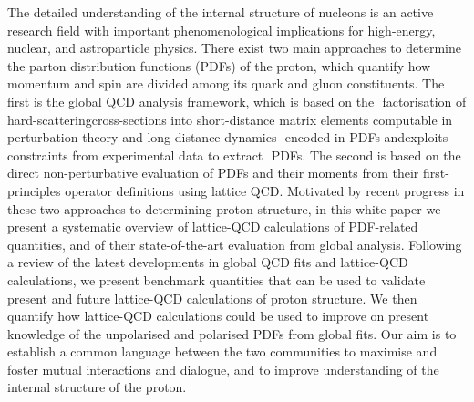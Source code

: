 \documentclass[twoside,12pt]{article}
\numberwithin{equation}{section}
\numberwithin{figure}{section}
\numberwithin{table}{section}
\begin{document}
The detailed understanding of the internal structure of nucleons is an active
research field with important phenomenological implications for
high-energy, nuclear, and astroparticle physics.
%
There exist two main approaches to determine the
parton distribution functions (PDFs) of the proton, which
quantify how momentum and spin 
are divided among its quark and gluon constituents.
%
The​ ​first​ ​is​ the ​global​ ​QCD​ ​analysis framework,​ ​which​ ​is​ ​based​ ​on the​ ​
factorisation​ ​of​ ​hard-scattering​ ​cross-sections​ ​into​ ​short-distance​ ​matrix​ 
​elements computable​ ​in​ ​perturbation​ ​theory​ ​and​ ​long-distance​ ​dynamics​ ​
encoded​ ​in​ ​PDFs and ​exploits constraints​ ​from​ ​experimental​ ​data​ ​to​ ​extract​ ​
PDFs.
%
The second is based on the direct non-perturbative evaluation of PDFs
and their moments from their first-principles operator
definitions using lattice QCD.
%
Motivated by recent progress in these two approaches
to determining proton structure, in this white paper we present a systematic
overview of lattice-QCD calculations of PDF-related quantities, and of
their state-of-the-art evaluation from global analysis.
%
Following a review of the latest
developments in global QCD fits and lattice-QCD calculations,
we present benchmark quantities that can be
used to validate present and future
lattice-QCD calculations of proton structure.
%
We then quantify how lattice-QCD calculations could be used
to improve on present knowledge
of the unpolarised and polarised PDFs from global fits.
%
Our aim is
to establish a common language between the two communities to 
maximise and foster mutual interactions and dialogue, and to improve
understanding of the internal structure of the proton.

\clearpage

  \tableofcontents

\clearpage











\appendix








\end{document}
